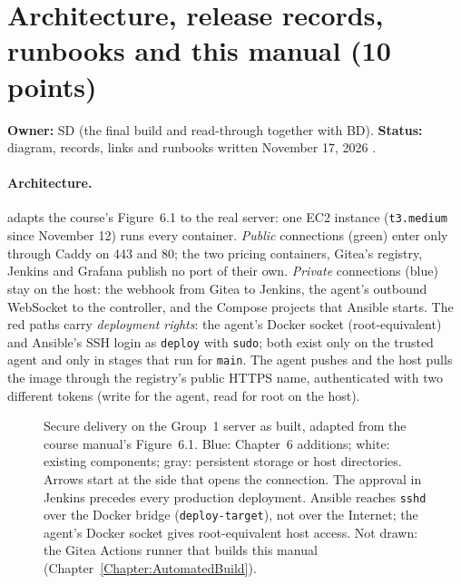\section{Architecture, release records, runbooks and this manual (10 points)}\label{Section:deliveryManual}
\textbf{Owner:} SD (the final build and read-through together with BD). \textbf{Status:} diagram, records, links and runbooks written November 17, 2026 \StatusPass.

\paragraph{Architecture.}  adapts the course's Figure~6.1 to the real server: one EC2 instance (\texttt{t3.medium} since November 12) runs every container.
\emph{Public} connections (green) enter only through Caddy on 443 and 80; the two pricing containers, Gitea's registry, Jenkins and Grafana publish no port of their own. \emph{Private} connections (blue) stay on the host:
the webhook from Gitea to Jenkins, the agent's outbound WebSocket to the controller, and the Compose projects that Ansible starts. The red paths carry \emph{deployment rights}: the agent's Docker socket (root-equivalent) and Ansible's
SSH login as \texttt{deploy} with \texttt{sudo}; both exist only on the trusted agent and only in stages that run for \texttt{main}. The agent pushes and the host pulls the image through the registry's public HTTPS name, authenticated with
two different tokens (write for the agent, read for root on the host).

\begin{figure}[htbp]\centering
\resizebox{\linewidth}{!}{}
\caption{Secure delivery on the Group~1 server as built, adapted from the course manual's Figure~6.1. Blue: Chapter~6 additions; white: existing components; gray: persistent storage or host directories.
Arrows start at the side that opens the connection. The approval in Jenkins precedes every production deployment. Ansible reaches \texttt{sshd} over the Docker bridge (\texttt{deploy-target}), not over the Internet;
the agent's Docker socket gives root-equivalent host access. Not drawn: the Gitea Actions runner that builds this manual (Chapter~\ref{Chapter:AutomatedBuild}).}
\label{Fig:EDeliveryDeployment}
\end{figure}

